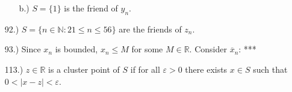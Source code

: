 \documentclass[12pt]{article}
\newcommand{\vertb}[1]{\left\vert#1\right\vert}
\begin{document}
\begin{itemize}
\begin{itemize}
        \item [b.)] $S=\{1\}$ is the friend of $y_n$.
    \end{itemize}

    \item [92.)] $S=\{n\in\mathbb{N}:21\leq n\leq56\}$ are the friends of $z_n$.

    \item [93.)] Since $x_n$ is bounded, $x_n\leq M$ for some $M\in\mathbb{R}$. Consider $\overline{x}_n$: ***



















    \item [113.)] $z\in\mathbb{R}$ is a cluster point of $S$ if for all $\varepsilon>0$ there exists $x\in S$ such that $0<\vertb{x-z}<\varepsilon$.


\end{itemize}
\end{document}
